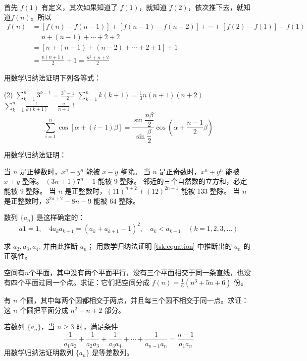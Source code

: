 首先 $f(1)$ 有定义，其次如果知道了 $f(1)$，就知道 $f(2)$，依次推下去，就知道$f(n)$。所以
\[\begin{split}
  f(n)&=[f(n)-f(n-1)]+[f(n-1)-f(n-2)]+\cdots +[f(2)-f(1)]+f(1)\\
  &=n+(n-1)+\cdots +2+2\\
  &=[n+(n-1)+(n-2)+\cdots +2+1]+1\\
  &=\frac{n(n+1)}{2}+1=\frac{n^2+n+2}{2}  
\end{split}\]


\begin{Exercise}
\begin{question}
    \item 用数学归纳法证明下列各等式： 
\begin{tasks}(2)
    \task $\displaystyle\sum^n_{k=1}3^{k-1}=\frac{3^n-1}{2}$
    \task $\displaystyle\sum^n_{k=1}k(k+1)=\frac{1}{3}n(n+1)(n+2)$
    \task $\displaystyle\sum^n_{k=1}\frac{1}{k(k+1)}=\frac{n}{n+1}$
    \task! \[\sum_{i=1}^{n}\cos[\alpha+(i-1)\beta]=\frac{\sin\dfrac{n\beta}{2}}{\sin\dfrac{\beta}{2}}\cos\left(\alpha+\frac{n-1}{2}\beta\right)\]
\end{tasks}

\item 用数学归纳法证明：
\begin{tasks}
\task 当 $n$ 是正整数时，$x^n-y^n$ 能被 $x-y$ 整除。
\task 当 $n$ 是正奇数时，$x^n+y^n$ 能被 $x+y$ 整除。
\task $(3n+1)7^n-1$ 能被 9 整除。
\task 邻近的三个自然数的立方和，必定能被 9 整除。
\task 当 $n$ 是正整数时，$(11)^{n+2}+(12)^{2n+1}$ 能被 133 整除。
\task 当 $n$ 是正整数时，$3^{2n+2}-8n-9$ 能被 64 整除。
\end{tasks}

\item 数列 $\{a_n\}$ 是这样确定的：
\[a1=1,\quad 4a_ka_{k+1}=(a_k+a_{k+1}-1)^2,\quad a_k<a_{k+1}\quad (k=1,2,3,\ldots)\]
\begin{tasks}
  \task\label{tsk:equation} 求 $a_2,a_3,a_4$, 并由此推断 $a_n$；
  \task 用数学归纳法证明 \ref{tsk:equation} 中推断出的 $a_n$ 的正确性。
\end{tasks}

\item 空间有$n$个平面，其中没有两个平面平行，没有三个平面相交于同一条直线，也没有四个平面过同一个点。求证：它们把空间分成 $f(n)=\frac{1}{6}(n^3+5n+6)$ 份。
\item 有 $n$ 个圆，其中每两个圆都相交于两点，并且每三个圆不相交于同一点。求证：这 $n$ 个圆把平面分成 $n^2-n+2$ 部分。
\item 若数列 $\{a_n\}$，当 $n\geqslant 3$ 时，满足条件
\[\frac{1}{a_1a_2}+\frac{1}{a_2a_3}+\frac{1}{a_3a_4}+\cdots+\frac{1}{a_{n-1}a_n}=\frac{n-1}{a_1a_n}\]
用数学归纳法证明数列 $\{a_n\}$ 是等差数列。
\end{question}
\end{Exercise}
